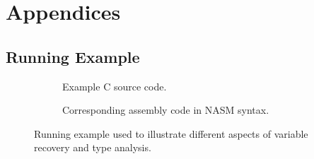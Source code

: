 
\onecolumn

\appendix
\setcounter{secnumdepth}{0}
\section{Appendices}
\setcounter{secnumdepth}{3}
\renewcommand{\thesubsection}{\Alph{subsection}}


\subsection{Running Example}
\label{app:running_example}

\begin{figure}[htbp]
	\centering
	\begin{subfigure}[ht]{0.3\textwidth}
		\centering
		
		\caption{Example C source code.}
		\label{fig:format_string_c}
	\end{subfigure}
	\qquad
	\begin{subfigure}[ht]{0.6\textwidth}
		\centering
		
		\caption{Corresponding assembly code in NASM syntax.}
		\label{fig:format_string_asm}
	\end{subfigure}
	\caption{Running example used to illustrate different aspects of variable recovery and type analysis.}
	\label{fig:running_example}
\end{figure}
